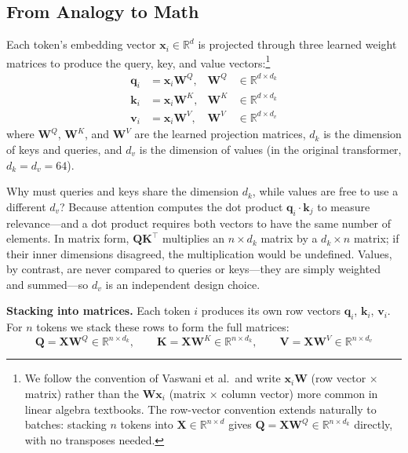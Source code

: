 \subsection{From Analogy to Math}

Each token's embedding vector $\mathbf{x}_i \in \mathbb{R}^d$ is projected through three learned weight matrices to produce the query, key, and value vectors:\footnote{We follow the convention of Vaswani et al.\ and write $\mathbf{x}_i\mathbf{W}$ (row vector $\times$ matrix) rather than the $\mathbf{W}\mathbf{x}_i$ (matrix $\times$ column vector) more common in linear algebra textbooks. The row-vector convention extends naturally to batches: stacking $n$ tokens into $\mathbf{X} \in \mathbb{R}^{n \times d}$ gives $\mathbf{Q} = \mathbf{X}\mathbf{W}^Q \in \mathbb{R}^{n \times d_k}$ directly, with no transposes needed.}
\begin{align}
\mathbf{q}_i &= \mathbf{x}_i \mathbf{W}^Q, & \mathbf{W}^Q &\in \mathbb{R}^{d \times d_k} \\
\mathbf{k}_i &= \mathbf{x}_i \mathbf{W}^K, & \mathbf{W}^K &\in \mathbb{R}^{d \times d_k} \\
\mathbf{v}_i &= \mathbf{x}_i \mathbf{W}^V, & \mathbf{W}^V &\in \mathbb{R}^{d \times d_v}
\end{align}
where $\mathbf{W}^Q$, $\mathbf{W}^K$, and $\mathbf{W}^V$ are the learned projection matrices, $d_k$ is the dimension of keys and queries, and $d_v$ is the dimension of values (in the original transformer, $d_k = d_v = 64$).

Why must queries and keys share the dimension $d_k$, while values are free to use a different $d_v$? Because attention computes the dot product $\mathbf{q}_i \cdot \mathbf{k}_j$ to measure relevance---and a dot product requires both vectors to have the same number of elements. In matrix form, $\mathbf{Q}\mathbf{K}^\top$ multiplies an $n \times d_k$ matrix by a $d_k \times n$ matrix; if their inner dimensions disagreed, the multiplication would be undefined. Values, by contrast, are never compared to queries or keys---they are simply weighted and summed---so $d_v$ is an independent design choice.

\textbf{Stacking into matrices.}\hspace{1em} Each token $i$ produces its own row vectors $\mathbf{q}_i$, $\mathbf{k}_i$, $\mathbf{v}_i$. For $n$ tokens we stack these rows to form the full matrices:
\begin{equation}
\mathbf{Q} = \mathbf{X}\mathbf{W}^Q \in \mathbb{R}^{n \times d_k}, \qquad
\mathbf{K} = \mathbf{X}\mathbf{W}^K \in \mathbb{R}^{n \times d_k}, \qquad
\mathbf{V} = \mathbf{X}\mathbf{W}^V \in \mathbb{R}^{n \times d_v}
\end{equation}


